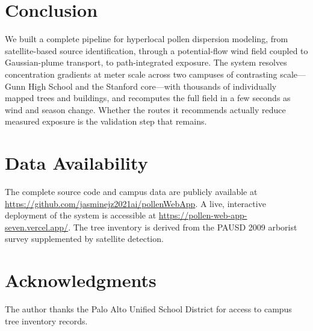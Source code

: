 \documentclass[11pt]{article}
\begin{document}
\section{Conclusion}

We built a complete pipeline for hyperlocal pollen dispersion modeling, from satellite-based source identification, through a potential-flow wind field coupled to Gaussian-plume transport, to path-integrated exposure. The system resolves concentration gradients at meter scale across two campuses of contrasting scale---Gunn High School and the Stanford core---with thousands of individually mapped trees and buildings, and recomputes the full field in a few seconds as wind and season change. Whether the routes it recommends actually reduce measured exposure is the validation step that remains.

\section*{Data Availability}

The complete source code and campus data are publicly available at \url{https://github.com/jasminejz2021ai/pollenWebApp}. A live, interactive deployment of the system is accessible at \url{https://pollen-web-app-seven.vercel.app/}. The tree inventory is derived from the PAUSD 2009 arborist survey supplemented by satellite detection.

\section*{Acknowledgments}

The author thanks the Palo Alto Unified School District for access to campus tree inventory records.
\end{document}
